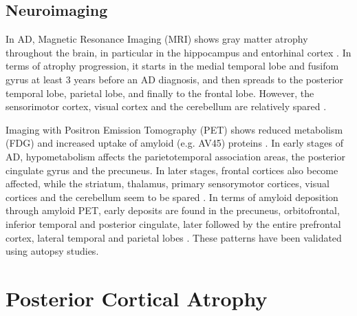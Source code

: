 \subsection{Neuroimaging}
\label{sec:bckNeu}

In AD, Magnetic Resonance Imaging (MRI) shows gray matter atrophy throughout the brain, in particular in the hippocampus and entorhinal cortex \cite{whitwell2010progression}. In terms of atrophy progression, it starts in the medial temporal lobe and fusifom gyrus at least 3 years before an AD diagnosis, and then spreads to the posterior temporal lobe, parietal lobe, and finally to the frontal lobe. However, the sensorimotor cortex, visual cortex and the cerebellum are relatively spared \cite{whitwell2010progression}.  

Imaging with Positron Emission Tomography (PET) shows reduced metabolism (FDG) and increased uptake of amyloid (e.g. AV45) proteins \cite{marcus2014brain}. In early stages of AD, hypometabolism affects the parietotemporal association areas, the posterior cingulate gyrus and the precuneus. In later stages, frontal cortices also become affected, while the striatum, thalamus, primary sensorymotor cortices, visual cortices and the cerebellum seem to be spared \cite{marcus2014brain}. In terms of amyloid deposition through amyloid PET, early deposits are found in the precuneus, orbitofrontal, inferior temporal and posterior cingulate, later followed by the entire prefrontal cortex, lateral temporal and parietal lobes \cite{marcus2014brain}. These patterns have been validated using autopsy studies\cite{clark2011use, clark2012cerebral}. 

\section{Posterior Cortical Atrophy}
\label{sec:bckPca}

